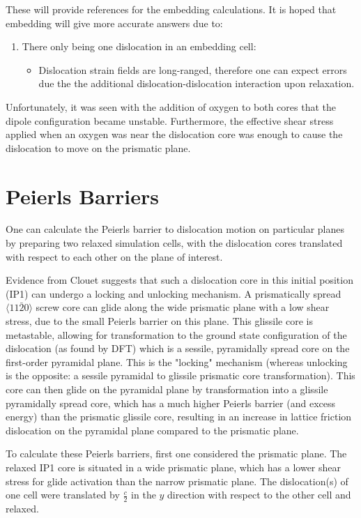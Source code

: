 \documentclass[11pt]{article}
\begin{document}
These will provide references for the embedding calculations. It is
hoped that embedding will give more accurate answers due to:
\begin{enumerate}
\item There only being one dislocation in an embedding cell:
\begin{itemize}
\item Dislocation strain fields are long-ranged, therefore one can
expect errors due the the additional dislocation-dislocation
interaction upon relaxation.
\end{itemize}
\end{enumerate}


Unfortunately, it was seen with the addition of oxygen to both
cores that the dipole configuration became unstable. Furthermore,
the effective shear stress applied when an oxygen was near the
dislocation core was enough to cause the dislocation to move on the
prismatic plane. 


\section{Peierls Barriers}
\label{sec:org71acb67}

One can calculate the Peierls barrier to dislocation motion on
particular planes by preparing two relaxed simulation cells, with
the dislocation cores translated with respect to each other on the
plane of interest. 

Evidence from Clouet \cite{Clouet2015} suggests that such a
dislocation core in this initial position (IP1) can undergo a
locking and unlocking mechanism. A prismatically spread \(\langle
  11\bar{2}0 \rangle\) screw core can glide along the wide prismatic
plane with a low shear stress, due to the small Peierls barrier on
this plane. This glissile core is metastable, allowing for
transformation to the ground state configuration of the dislocation
(as found by DFT) which is a sessile, pyramidally spread core on the
first-order pyramidal plane. This is the "locking" mechanism
(whereas unlocking is the opposite: a sessile pyramidal to glissile
prismatic core transformation). This core can then glide on the
pyramidal plane by transformation into a glissile pyramidally spread
core, which has a much higher Peierls barrier (and excess energy)
than the prismatic glissile core, resulting in an increase in
lattice friction dislocation on the pyramidal plane compared to the
prismatic plane.

To calculate these Peierls barriers, first one considered the
prismatic plane. The relaxed IP1 core is situated in a wide
prismatic plane, which has a lower shear stress for glide activation
than the narrow prismatic plane. The dislocation(s) of one cell were
translated by \(\frac{c}{2}\) in the \(y\) direction with respect to the other
cell and relaxed. 
\end{document}
